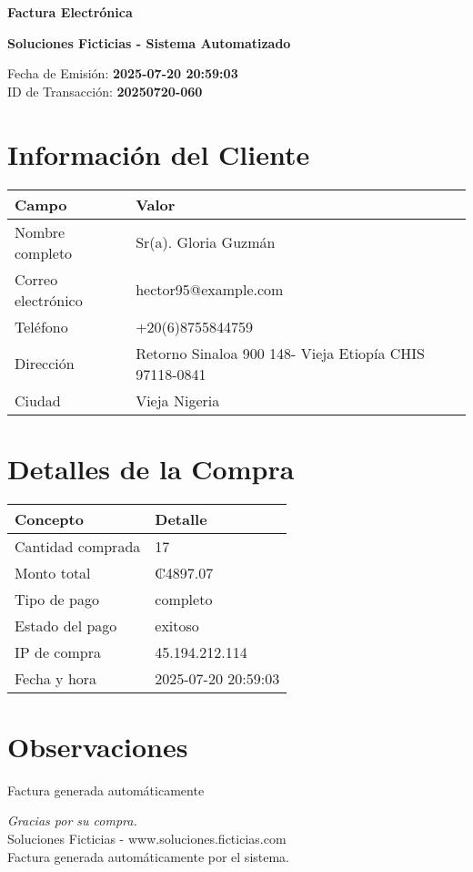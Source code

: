 \documentclass[12pt]{article}
\begin{document}
\begin{center}
    \Huge \textbf{Factura Electrónica}

    \vspace{0.3cm}
    \large \textbf{Soluciones Ficticias - Sistema Automatizado}

    \vspace{0.5cm}
    \normalsize Fecha de Emisión: \textbf{2025-07-20 20:59:03} \\
    ID de Transacción: \textbf{20250720-060} \\
\end{center}

\vspace{1cm}

\section*{Información del Cliente}
\begin{tabularx}{\textwidth}{L{4cm} L{12cm}}
\textbf{Campo} & \textbf{Valor} \\
\hline
Nombre completo & Sr(a). Gloria Guzmán \\
Correo electrónico & hector95@example.com \\
Teléfono & +20(6)8755844759 \\
Dirección & Retorno Sinaloa 900 148- Vieja Etiopía  CHIS 97118-0841 \\
Ciudad & Vieja Nigeria \\
\end{tabularx}

\vspace{0.8cm}

\section*{Detalles de la Compra}
\begin{tabularx}{\textwidth}{L{6cm} L{10cm}}
\textbf{Concepto} & \textbf{Detalle} \\
\hline
Cantidad comprada & 17 \\
Monto total & ₡4897.07 \\
Tipo de pago & completo \\
Estado del pago & exitoso \\
IP de compra & 45.194.212.114 \\
Fecha y hora & 2025-07-20 20:59:03 \\
\end{tabularx}

\vspace{1.5cm}

\section*{Observaciones}
Factura generada automáticamente

\vfill

\begin{center}
    \textit{Gracias por su compra.} \\
    Soluciones Ficticias - www.soluciones.ficticias.com \\
    Factura generada automáticamente por el sistema.
\end{center}
\end{document}
